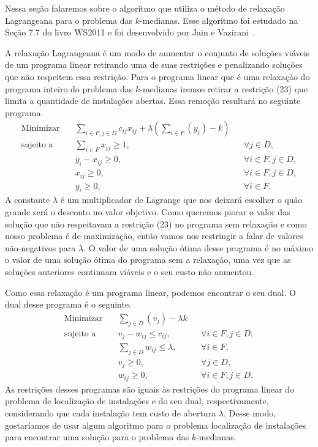 Nessa seção falaremos sobre o algoritmo que utiliza o método de relaxação Lagrangeana para o problema das $k$-medianas. Esse algoritmo foi estudado na Seção 7.7 do livro WS2011 e foi desenvolvido por Jain e Vazirani~\cite{JV}.

A relaxação Lagrangeana é um modo de aumentar o conjunto de soluções viáveis de um programa linear retirando uma de suas restrições e penalizando soluções que não respeitem essa restrição. Para o programa linear que é uma relaxação do programa inteiro do problema das $k$-medianas iremos retirar a restrição (23) que limita a quantidade de instalações abertas. Essa remoção resultará no seguinte programa.
\begin{align}
    \text{Minimizar} \quad & \sum_{i \in F, j \in D} c_{ij}x_{ij} + \lambda \left(\sum_{i \in F} (y_i) - k\right) \\
    \text{sujeito a} \quad & \sum_{i \in F} x_{ij} \geq 1, &&\forall j \in D, \\
                           & y_i - x_{ij} \geq 0, &&\forall i \in F, j \in D, \\
                           & x_{ij} \geq 0, && \forall i \in F,j \in D, \\
                           & y_i \geq 0, &&\forall i \in F.
\end{align}
A constante $\lambda$ é um multiplicador de Lagrange que nos deixará escolher o quão grande será o desconto no valor objetivo.
Como queremos piorar o valor das solução que não respeitavam a restrição (23) no programa sem relaxação e como nosso problema é de maximização, então vamos nos restringir a falar de valores não-negativos para $\lambda$.
O valor de uma solução ótima desse programa é no máximo o valor de uma solução ótima do programa sem a relaxação, uma vez que as soluções anteriores continuam viáveis e o seu custo não aumentou.

Como essa relaxação é um programa linear, podemos encontrar o seu dual. O dual desse programa é o seguinte.
\begin{align*}
    \text{Minimizar} \quad & \sum_{j \in D} (v_j) - \lambda k \\
    \text{sujeito a} \quad & v_j - w_{ij} \leq c_{ij}, &&\forall i \in F, j\in D, \\
                           & \sum_{j\in D} w_{ij} \leq \lambda, &&\forall i \in F, \\
                           & v_j \geq 0, &&\forall j\in D, \\
                           & w_{ij} \geq 0, && \forall i \in F,j \in D.
\end{align*}
As restrições desses programas são iguais às restrições do programa linear do problema de localização de instalações e do seu dual, respectivamente, considerando que cada instalação tem custo de abertura $\lambda$.
Desse modo, gostaríamos de usar algum algoritmo para o problema localização de instalações para encontrar uma solução para o problema das $k$-medianas. 


